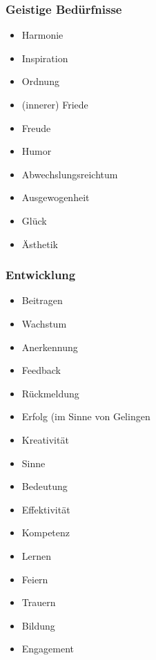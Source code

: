 \subsubsection{Geistige Bedürfnisse}

\begin{multicols}{2}
  \begin{itemize}
    \item Harmonie
    \item Inspiration
    \item \glqq Ordnung\grqq
    \item (innerer) Friede
    \item Freude
    \item Humor
    \item Abwechslungsreichtum
    \item Ausgewogenheit
    \item Glück
    \item Ästhetik
  \end{itemize}
\end{multicols}


\subsubsection{Entwicklung}

\begin{multicols}{2}
  \begin{itemize}
    \item Beitragen
    \item Wachstum
    \item Anerkennung
    \item Feedback
    \item Rückmeldung
    \item Erfolg (im Sinne von \glqq Gelingen\grqq
    \item Kreativität
    \item Sinne
    \item Bedeutung
    \item Effektivität
    \item Kompetenz
    \item Lernen
    \item Feiern
    \item Trauern
    \item Bildung
    \item Engagement
  \end{itemize}
\end{multicols}

